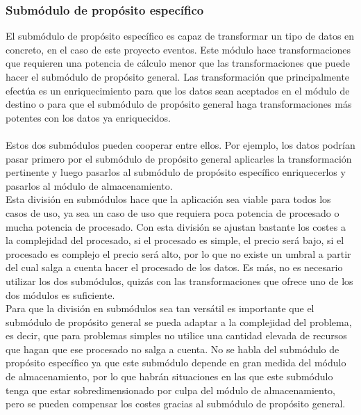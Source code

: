 \subsubsection{Submódulo de propósito específico}
El submódulo de propósito específico es capaz de transformar un tipo de datos en concreto, en el caso de este proyecto eventos. Este módulo hace transformaciones que requieren una potencia de cálculo menor que las transformaciones que puede hacer el submódulo de propósito general. Las transformación que principalmente efectúa es un enriquecimiento para que los datos sean aceptados en el módulo de destino o para que el submódulo de propósito general haga transformaciones más potentes con los datos ya enriquecidos. \\\\


Estos dos submódulos pueden cooperar entre ellos. Por ejemplo, los datos podrían pasar primero por el submódulo de propósito general aplicarles la transformación pertinente y luego pasarlos al submódulo de propósito específico enriquecerlos y pasarlos al módulo de almacenamiento.
\\
Esta división en submódulos hace que la aplicación sea viable para todos los casos de uso, ya sea un caso de uso que requiera poca potencia de procesado o mucha potencia de procesado. Con esta división se ajustan bastante los costes a la complejidad del procesado, si el procesado es simple, el precio será bajo, si el procesado es complejo el precio será alto, por lo que no existe un umbral a partir del cual salga a cuenta hacer el procesado de los datos. Es más, no es necesario utilizar los dos submódulos, quizás con las transformaciones que ofrece uno de los dos módulos es suficiente. 
\\
Para que la división en submódulos sea tan versátil es importante que el submódulo de propósito general se pueda adaptar a la complejidad del problema, es decir, que para problemas simples no utilice una cantidad elevada de recursos que hagan que ese procesado no salga a cuenta. No se habla del submódulo de propósito específico ya que este submódulo depende en gran medida del módulo de almacenamiento, por lo que habrán situaciones en las que este submódulo tenga que estar sobredimensionado por culpa del módulo de almacenamiento, pero se pueden compensar los costes gracias al submódulo de propósito general.



